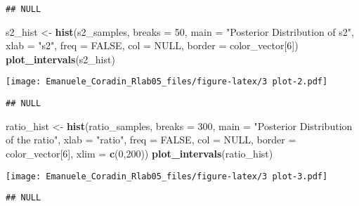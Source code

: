 \documentclass[
]{article}
\newenvironment{Shaded}{\begin{snugshade}}{\end{snugshade}}
\newcommand{\AttributeTok}[1]{\textcolor[rgb]{0.13,0.29,0.53}{#1}}
\newcommand{\ConstantTok}[1]{\textcolor[rgb]{0.56,0.35,0.01}{#1}}
\newcommand{\DecValTok}[1]{\textcolor[rgb]{0.00,0.00,0.81}{#1}}
\newcommand{\FunctionTok}[1]{\textcolor[rgb]{0.13,0.29,0.53}{\textbf{#1}}}
\newcommand{\NormalTok}[1]{#1}
\newcommand{\OtherTok}[1]{\textcolor[rgb]{0.56,0.35,0.01}{#1}}
\newcommand{\StringTok}[1]{\textcolor[rgb]{0.31,0.60,0.02}{#1}}
\begin{document}
\begin{verbatim}
## NULL
\end{verbatim}

\begin{Shaded}
\begin{Highlighting}[]
\NormalTok{s2\_hist }\OtherTok{\textless{}{-}} \FunctionTok{hist}\NormalTok{(s2\_samples, }\AttributeTok{breaks =} \DecValTok{50}\NormalTok{, }\AttributeTok{main =} \StringTok{"Posterior Distribution of s2"}\NormalTok{, }\AttributeTok{xlab =} \StringTok{"s2"}\NormalTok{, }\AttributeTok{freq =} \ConstantTok{FALSE}\NormalTok{, }\AttributeTok{col =} \ConstantTok{NULL}\NormalTok{, }\AttributeTok{border =}\NormalTok{ color\_vector[}\DecValTok{6}\NormalTok{])}
\FunctionTok{plot\_intervals}\NormalTok{(s2\_hist)}
\end{Highlighting}
\end{Shaded}

\texttt{[image: Emanuele\_Coradin\_Rlab05\_files/figure-latex/3 plot-2.pdf]}

\begin{verbatim}
## NULL
\end{verbatim}

\begin{Shaded}
\begin{Highlighting}[]
\NormalTok{ratio\_hist }\OtherTok{\textless{}{-}} \FunctionTok{hist}\NormalTok{(ratio\_samples, }\AttributeTok{breaks =} \DecValTok{300}\NormalTok{, }\AttributeTok{main =} \StringTok{"Posterior Distribution of the ratio"}\NormalTok{, }\AttributeTok{xlab =} \StringTok{"ratio"}\NormalTok{, }\AttributeTok{freq =} \ConstantTok{FALSE}\NormalTok{, }\AttributeTok{col =} \ConstantTok{NULL}\NormalTok{, }\AttributeTok{border =}\NormalTok{ color\_vector[}\DecValTok{6}\NormalTok{], }\AttributeTok{xlim =} \FunctionTok{c}\NormalTok{(}\DecValTok{0}\NormalTok{,}\DecValTok{200}\NormalTok{))}
\FunctionTok{plot\_intervals}\NormalTok{(ratio\_hist)}
\end{Highlighting}
\end{Shaded}

\texttt{[image: Emanuele\_Coradin\_Rlab05\_files/figure-latex/3 plot-3.pdf]}

\begin{verbatim}
## NULL
\end{verbatim}
\end{document}
